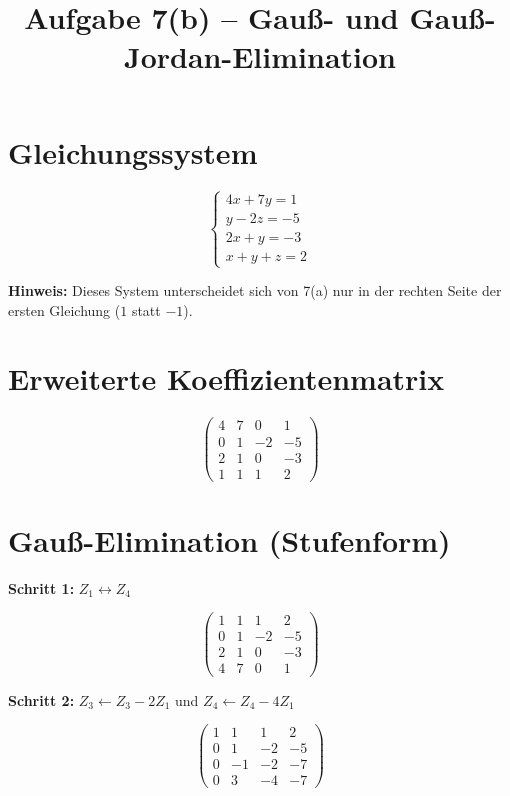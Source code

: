 \documentclass[a4paper,12pt]{article}
\title{Aufgabe 7(b) -- Gauß- und Gauß-Jordan-Elimination}
\author{}
\date{}
\begin{document}
\maketitle

\section*{Gleichungssystem}

\[
\begin{cases}
4x + 7y = 1 \\
y - 2z = -5 \\
2x + y = -3 \\
x + y + z = 2
\end{cases}
\]

\textbf{Hinweis:} Dieses System unterscheidet sich von 7(a) nur in der rechten Seite der ersten Gleichung ($1$ statt $-1$).

\section*{Erweiterte Koeffizientenmatrix}

\[
\left(\begin{array}{ccc|c}
4 & 7 & 0 & 1 \\
0 & 1 & -2 & -5 \\
2 & 1 & 0 & -3 \\
1 & 1 & 1 & 2
\end{array}\right)
\]

\section*{Gauß-Elimination (Stufenform)}

\textbf{Schritt 1:} $Z_1 \leftrightarrow Z_4$

\[
\left(\begin{array}{ccc|c}
1 & 1 & 1 & 2 \\
0 & 1 & -2 & -5 \\
2 & 1 & 0 & -3 \\
4 & 7 & 0 & 1
\end{array}\right)
\]

\textbf{Schritt 2:} $Z_3 \leftarrow Z_3 - 2Z_1$ und $Z_4 \leftarrow Z_4 - 4Z_1$

\[
\left(\begin{array}{ccc|c}
1 & 1 & 1 & 2 \\
0 & 1 & -2 & -5 \\
0 & -1 & -2 & -7 \\
0 & 3 & -4 & -7
\end{array}\right)
\]
\end{document}
